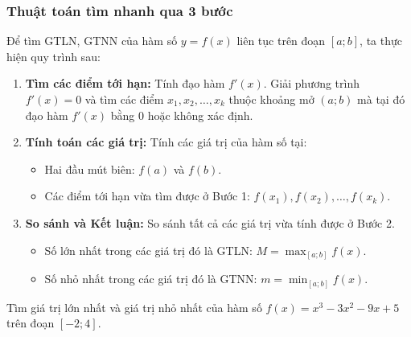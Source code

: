 \documentclass[12pt]{article}
\begin{document}
	\subsubsection{Thuật toán tìm nhanh qua 3 bước}
	Để tìm GTLN, GTNN của hàm số $y = f(x)$ liên tục trên đoạn $[a; b]$, ta thực hiện quy trình sau:
	
	\begin{enumerate}[label=\textbf{Bước \arabic*:}, leftmargin=*]
		\item \textbf{Tìm các điểm tới hạn:} Tính đạo hàm $f'(x)$. Giải phương trình $f'(x) = 0$ và tìm các điểm $x_1, x_2, \dots, x_k$ thuộc khoảng mở $(a; b)$ mà tại đó đạo hàm $f'(x)$ bằng $0$ hoặc không xác định.
		\item \textbf{Tính toán các giá trị:} Tính các giá trị của hàm số tại:
		\begin{itemize}
			\item Hai đầu mút biên: $f(a)$ và $f(b)$.
			\item Các điểm tới hạn vừa tìm được ở Bước 1: $f(x_1), f(x_2), \dots, f(x_k)$.
		\end{itemize}
		\item \textbf{So sánh và Kết luận:} So sánh tất cả các giá trị vừa tính được ở Bước 2.
		\begin{itemize}
			\item Số lớn nhất trong các giá trị đó là GTLN: $M = \max_{[a; b]} f(x)$.
			\item Số nhỏ nhất trong các giá trị đó là GTNN: $m = \min_{[a; b]} f(x)$.
		\end{itemize}
	\end{enumerate}
	
	\begin{vidu}[2]
		Tìm giá trị lớn nhất và giá trị nhỏ nhất của hàm số $f(x) = x^3 - 3x^2 - 9x + 5$ trên đoạn $[-2; 4]$.
	\end{vidu}
	
\end{document}

